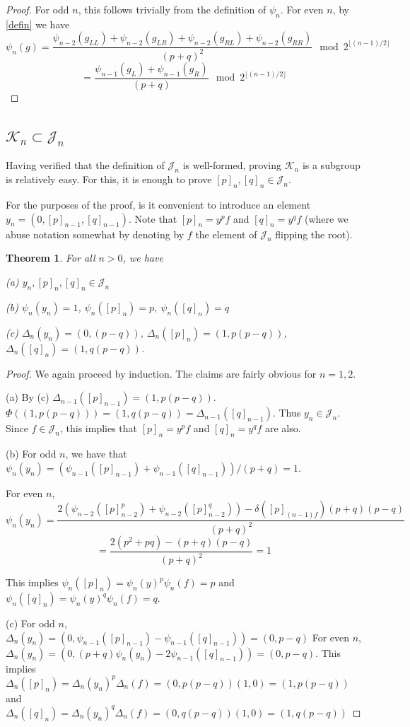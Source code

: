 \documentclass[11pt]{article}
\theoremstyle{plain}
\newtheorem{theorem}{Theorem}
\theoremstyle{definition}
\begin{document}
\begin{proof}
    For odd $n$, this follows trivially from the definition of $\psi_n$. For even $n$, by \ref{defin} we have 
    $$\psi_n(g) = \frac{\psi_{n-2}(g_{LL}) + \psi_{n-2}(g_{LR}) +\psi_{n-2}(g_{RL}) +\psi_{n-2}(g_{RR})}{(p+q)^2} \mod 2^{\lfloor (n-1)/2 \rfloor}$$
    $$ = \frac{\psi_{n-1}(g_L) + \psi_{n-1}(g_{R})}{(p+q)} \mod 2^{\lfloor (n-1)/2 \rfloor}$$
\end{proof}

\subsection{$\mathcal{K}_n \subset \mathcal{J}_n$}

Having verified that the definition of $\mathcal{J}_n$ is well-formed, proving $\mathcal{K}_n$ is a subgroup is relatively easy. For this, it is enough to prove $[p]_n, [q]_n \in \mathcal{J}_n$.

For the purposes of the proof, is it convenient to introduce an element $y_n = (0, [p]_{n-1}, [q]_{n-1})$. Note that $[p]_n = y^p f$ and $[q]_n = y^q f$ (where we abuse notation somewhat by denoting by $f$ the element of $\mathcal{J}_n$ flipping the root).

\begin{theorem}

For all $n > 0$, we have 

(a) $y_n, [p]_n, [q]_n \in \mathcal{J}_n$

(b) $\psi_n(y_n) = 1$, $\psi_n([p]_n) = p$, $\psi_n([q]_n) = q$

(c) $\Delta_n(y_n) = (0,(p-q))$, $\Delta_n([p]_n) = (1, p(p-q))$, $\Delta_n([q]_n) = (1,q(p-q))$.

\end{theorem}

\begin{proof}

We again proceed by induction. The claims are fairly obvious for $n=1, 2$. 


(a) By (c) $\Delta_{n-1}([p]_{n-1}) = (1, p(p-q))$. $\Phi((1, p(p-q))) = (1, q(p-q)) = \Delta_{n-1}([q]_{n-1}) $. Thus $y_n \in \mathcal{J}_n$. Since $f \in \mathcal{J}_n$, this implies that $[p]_n = y^p f$ and $[q]_n = y^q f$ are also.

(b) For odd $n$, we have that $\psi_n(y_n) = (\psi_{n-1}([p]_{n-1}) + \psi_{n-1}([q]_{n-1}))/(p+q) = 1$. 

For even $n$, $$\psi_n(y_n) = \frac{2(\psi_{n-2}([p]_{n-2}^p) +\psi_{n-2}([p]_{n-2}^q)) - \delta([p]_{(n-1)f})(p+q)(p-q)}{(p+q)^2}$$
$$=\frac{2(p^2 + pq) - (p+q)(p-q)}{(p+q)^2} = 1 $$

This implies $\psi_n([p]_n) = \psi_n(y)^p\psi_n(f) = p$ and $\psi_n([q]_n) = \psi_n(y)^q\psi_n(f) = q$.


(c) For odd $n$, $\Delta_n(y_n) = (0, \psi_{n-1}([p]_{n-1}) - \psi_{n-1}([q]_{n-1})) = (0, p-q)$
For even $n$, $\Delta_n(y_n) = (0, (p+q)\psi_n(y_n) - 2\psi_{n-1}([q]_{n-1})) = (0, p-q)$.
This implies $\Delta_n([p]_n) = \Delta_n(y_n)^p\Delta_n(f) = (0,p(p-q))(1,0)=(1,p(p-q))$ and $\Delta_n([q]_n) = \Delta_n(y_n)^q\Delta_n(f) = (0,q(p-q))(1,0)=(1,q(p-q))$

\end{proof}
\end{document}

